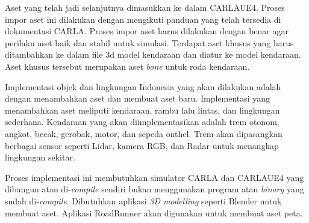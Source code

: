 Aset yang telah jadi selanjutnya dimasukkan ke dalam CARLAUE4. Proses impor aset
ini dilakukan dengan mengikuti panduan yang telah tersedia di dokumentasi CARLA.
Proses impor aset harus dilakukan dengan benar agar perilaku aset baik dan
stabil untuk simulasi. Terdapat aset khusus yang harus ditambahkan ke dalam file
3d model kendaraan dan diatur ke model kendaraan. Aset khusus tersebut merupakan
aset \textit{bone} untuk roda kendaraan.


Implementasi objek dan lingkungan Indonesia yang akan dilakukan adalah dengan
menambahkan aset dan membuat aset baru. Implementasi yang menambahkan aset
meliputi kendaraan, rambu lalu lintas, dan lingkungan sederhana. Kendaraan yang
akan diimplementasikan adalah trem otonom, angkot, becak, gerobak, motor, dan
sepeda onthel. Trem akan dipasangkan berbagai sensor seperti Lidar, kamera RGB,
dan Radar untuk menangkap lingkungan sekitar.



Proses implementasi ini membutuhkan simulator CARLA dan CARLAUE4 yang dibangun
atau di-\textit{compile} sendiri bukan menggunakan program atau \textit{binary}
yang sudah di-\textit{compile}.
Dibutuhkan aplikasi \textit{3D modelling} seperti Blender untuk membuat aset.
Aplikasi RoadRunner akan digunakan untuk membuat aset peta.

